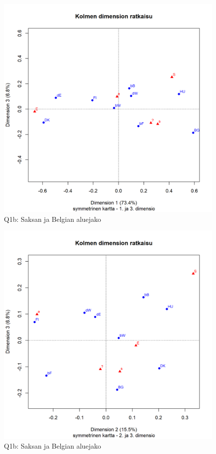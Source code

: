 \documentclass[
  finnish,
]{book}
\begin{document}
\begin{figure}

{\centering \includegraphics[width=0.9\linewidth]{JH_capaper_files/figure-latex/suppointCA3map2-1} 

}

\caption{Q1b: Saksan ja  Belgian aluejako }\label{fig:suppointCA3map2}
\end{figure}

\begin{figure}

{\centering \includegraphics[width=0.9\linewidth]{JH_capaper_files/figure-latex/suppointCA3map3-1} 

}

\caption{Q1b: Saksan ja  Belgian aluejako }\label{fig:suppointCA3map3}
\end{figure}
\end{document}

